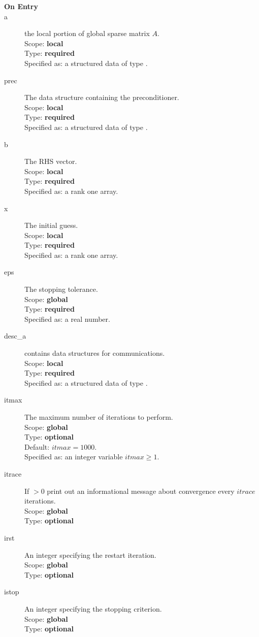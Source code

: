 \begin{description}
\item[\bf On Entry]
\item[a] the local portion of global sparse matrix
$A$. \\
Scope: {\bf local} \\
Type: {\bf required}\\
Specified as: a structured data of type \spdata.
\item[prec] The data structure containing the preconditioner.\\
Scope: {\bf local} \\
Type: {\bf required}\\
Specified as: a structured data of type \precdata.
\item[b] The RHS vector. \\
Scope: {\bf local} \\
Type: {\bf required}\\
Specified as: a rank one array.
\item[x] The initial guess. \\
Scope: {\bf local} \\
Type: {\bf required}\\
Specified as: a rank one array.
\item[eps] The stopping tolerance. \\
Scope: {\bf global} \\
Type: {\bf required}\\
Specified as: a real number. 
\item[desc\_a] contains data structures for communications.\\
Scope: {\bf local} \\
Type: {\bf required}\\
Specified as: a structured data of type \descdata.
\item[itmax]  The maximum number of iterations to perform.\\
Scope: {\bf global} \\
Type: {\bf optional}\\
Default: $itmax = 1000$.\\
Specified as: an integer variable $itmax \ge 1$.
\item[itrace]  If $>0$  print out an informational message about
  convergence  every $itrace$ iterations.\\ 
Scope: {\bf global} \\
Type: {\bf optional}\\
\item[irst]  An integer specifying the restart iteration.\\
Scope: {\bf global} \\
Type: {\bf optional}\\
\item[istop]  An integer specifying the stopping criterion.\\
Scope: {\bf global} \\
Type: {\bf optional}\\


\end{description}
